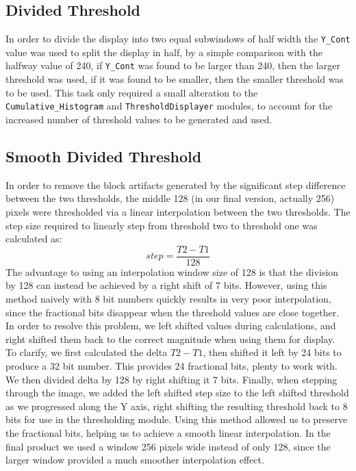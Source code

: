 \documentclass[12pt]{article}
\begin{document}
  \subsection{Divided Threshold}
  In order to divide the display into two equal subwindows of half width the \texttt{Y\_Cont} value was used to split the display in half, by a simple comparison with the halfway value of 240, if \texttt{Y\_Cont} was found to be larger than 240, then the larger threshold was used, if it was found to be smaller, then the smaller threshold was to be used. This task only required a small alteration to the \texttt{Cumulative\_Histogram} and \texttt{ThresholdDisplayer} modules, to account for the increased number of threshold values to be generated and used.

  \subsection{Smooth Divided Threshold}
  In order to remove the block artifacts generated by the significant step difference between the two thresholds, the middle 128 (in our final version, actually 256) pixels were thresholded via a linear interpolation between the two thresholds. The step size required to linearly step from threshold two to threshold one was calculated as:
      \begin{equation}
      step = \frac{T2 - T1}{128}
      \end{equation}
  The advantage to using an interpolation window size of 128 is that the division by 128 can instead be achieved by a right shift of 7 bits. However, using this method naively with 8 bit numbers quickly results in very poor interpolation, since the fractional bits disappear when the threshold values are close together. In order to resolve this problem, we left shifted values during calculations, and right shifted them back to the correct magnitude when using them for display.\\
      
  To clarify, we first calculated the delta \(T2 - T1\), then shifted it left by 24 bits to produce a 32 bit number. This provides 24 fractional bits, plenty to work with. We then divided delta by 128 by right shifting it 7 bits. Finally, when stepping through the image, we added the left shifted step size to the left shifted threshold as we progressed along the Y axis, right shifting the resulting threshold back to 8 bits for use in the thresholding module. Using this method allowed us to preserve the fractional bits, helping us to achieve a smooth linear interpolation. In the final product we used a window 256 pixels wide instead of only 128, since the larger window provided a much smoother interpolation effect.
\end{document}
